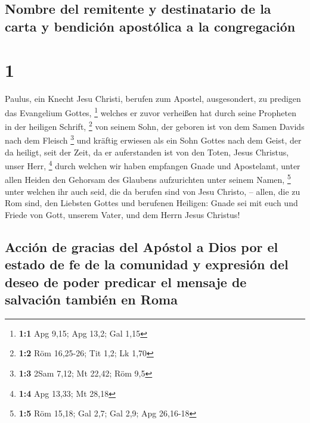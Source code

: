 \hypertarget{nombre-del-remitente-y-destinatario-de-la-carta-y-bendiciuxf3n-apostuxf3lica-a-la-congregaciuxf3n}{%
\subsection{Nombre del remitente y destinatario de la carta y bendición
apostólica a la
congregación}\label{nombre-del-remitente-y-destinatario-de-la-carta-y-bendiciuxf3n-apostuxf3lica-a-la-congregaciuxf3n}}

\hypertarget{section}{%
\section{1}\label{section}}

 Paulus, ein Knecht Jesu Christi, berufen zum Apostel,
ausgesondert, zu predigen das Evangelium Gottes, \footnote{\textbf{1:1}
  Apg 9,15; Apg 13,2; Gal 1,15}  welches er zuvor
verheißen hat durch seine Propheten in der heiligen Schrift, \footnote{\textbf{1:2}
  Röm 16,25-26; Tit 1,2; Lk 1,70}  von seinem Sohn, der
geboren ist von dem Samen Davids nach dem Fleisch \footnote{\textbf{1:3}
  2Sam 7,12; Mt 22,42; Röm 9,5}  und kräftig erwiesen als
ein Sohn Gottes nach dem Geist, der da heiligt, seit der Zeit, da er
auferstanden ist von den Toten, Jesus Christus, unser Herr, \footnote{\textbf{1:4}
  Apg 13,33; Mt 28,18}  durch welchen wir haben empfangen
Gnade und Apostelamt, unter allen Heiden den Gehorsam des Glaubens
aufzurichten unter seinem Namen, \footnote{\textbf{1:5} Röm 15,18; Gal
  2,7; Gal 2,9; Apg 26,16-18}  unter welchen ihr auch
seid, die da berufen sind von Jesu Christo, --  allen, die
zu Rom sind, den Liebsten Gottes und berufenen Heiligen: Gnade sei mit
euch und Friede von Gott, unserem Vater, und dem Herrn Jesus Christus!

\hypertarget{acciuxf3n-de-gracias-del-apuxf3stol-a-dios-por-el-estado-de-fe-de-la-comunidad-y-expresiuxf3n-del-deseo-de-poder-predicar-el-mensaje-de-salvaciuxf3n-tambiuxe9n-en-roma}{%
\subsection{Acción de gracias del Apóstol a Dios por el estado de fe de
la comunidad y expresión del deseo de poder predicar el mensaje de
salvación también en
Roma}\label{acciuxf3n-de-gracias-del-apuxf3stol-a-dios-por-el-estado-de-fe-de-la-comunidad-y-expresiuxf3n-del-deseo-de-poder-predicar-el-mensaje-de-salvaciuxf3n-tambiuxe9n-en-roma}}

